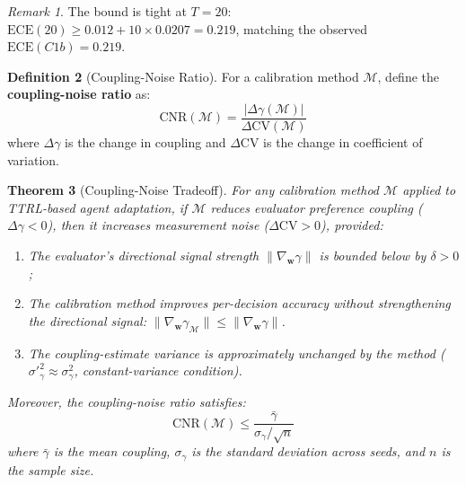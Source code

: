 \documentclass[11pt]{article}
\newcommand{\CV}{\ensuremath{\mathrm{CV}}}
\newcommand{\ECE}{\ensuremath{\mathrm{ECE}}}
\newtheorem{theorem}{Theorem}
\theoremstyle{definition}
\newtheorem{definition}[theorem]{Definition}
\theoremstyle{remark}
\newtheorem{remark}[theorem]{Remark}
\begin{document}
\begin{remark}
The bound is tight at $T{=}20$: $\ECE(20) \geq 0.012 + 10 \times 0.0207 = 0.219$, matching the observed $\ECE(C1b) = 0.219$.
\end{remark}

\begin{definition}[Coupling-Noise Ratio]
For a calibration method $\mathcal{M}$, define the \textbf{coupling-noise ratio} as:
\begin{equation}
    \text{CNR}(\mathcal{M}) = \frac{|\Delta\gamma(\mathcal{M})|}{\Delta\CV(\mathcal{M})}
\end{equation}
where $\Delta\gamma$ is the change in coupling and $\Delta\CV$ is the change in coefficient of variation.
\end{definition}

\begin{theorem}[Coupling-Noise Tradeoff]\label{thm:tradeoff}
For any calibration method $\mathcal{M}$ applied to TTRL-based agent adaptation, if $\mathcal{M}$ reduces evaluator preference coupling ($\Delta\gamma < 0$), then it increases measurement noise ($\Delta\CV > 0$), provided:
\begin{enumerate}[leftmargin=*,nosep]
    \item The evaluator's directional signal strength $\|\nabla_{\mathbf{w}} \gamma\|$ is bounded below by $\delta > 0$;
    \item The calibration method improves per-decision accuracy without strengthening the directional signal: $\|\nabla_{\mathbf{w}} \gamma_{\mathcal{M}}\| \leq \|\nabla_{\mathbf{w}} \gamma\|$.
    \item The coupling-estimate variance is approximately unchanged by the method ($\sigma'^2_{\gamma} \approx \sigma^2_{\gamma}$, constant-variance condition).
\end{enumerate}
Moreover, the coupling-noise ratio satisfies:
\begin{equation}
    \text{CNR}(\mathcal{M}) \leq \frac{\bar{\gamma}}{\sigma_{\gamma} / \sqrt{n}}
\end{equation}
where $\bar{\gamma}$ is the mean coupling, $\sigma_{\gamma}$ is the standard deviation across seeds, and $n$ is the sample size.
\end{theorem}
\end{document}
